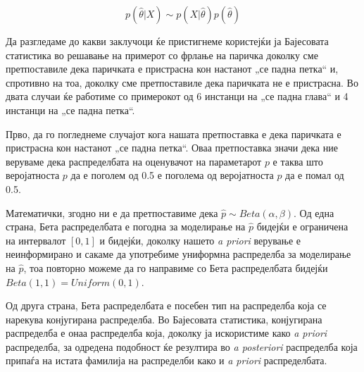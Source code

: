 \documentclass[12pt]{article}
\numberwithin{equation}{section}
\begin{document}
\begin{equation}\label{bayes_eq_sim}
p(\widehat{\theta}|X) \sim p(X|\widehat{\theta})p(\widehat{\theta})
\end{equation}

Да разгледаме до какви заклучоци ќе пристигнеме користејќи ја Бајесовата статистика во решавање на примерот со фрлање на паричка доколку сме претпоставиле дека паричката е пристрасна кон настанот „се падна петка“ и, спротивно на тоа, доколку сме претпоставиле дека паричката не е пристрасна. Во двата случаи ќе работиме со примерокот од 6 инстанци на „се падна глава“ и 4 инстанци на „се падна петка“.

Прво, да го погледнеме случајот кога нашата претпоставка е дека паричката е пристрасна кон настанот „се падна петка“. Оваа претпоставка значи дека ние веруваме дека распределбата на оценувачот на параметарот \(p\) е таква што веројатноста \(p\) да е поголем од 0.5 е поголема од веројатноста \(p\) да е помал од 0.5.

Математички, згодно ни е да претпоставиме дека \(\widehat{p} \sim Beta(\alpha, \beta)\). Од една страна, Бета распределбата е погодна за моделирање на \(\widehat{p}\) бидејќи е ограничена на интервалот \([0, 1]\) и бидејќи, доколку нашето \textit{a priori} верување е неинформирано и сакаме да употребиме униформна распределба за моделирање на \(\widehat{p}\), тоа повторно можеме да го направиме со Бета распределбата бидејќи \(Beta(1, 1) = Uniform(0, 1)\).

Од друга страна, Бета распределбата е посебен тип на распределба која се нарекува конјугирана распределба. Во Бајесовата статистика, конјугирана распределба е онаа распределба која, доколку ја искористиме како \textit{a priori} распределба, за одредена подобност ќе резултира во \textit{a posteriori} распределба која припаѓа на истата фамилија на распределби како и \textit{a priori} распределбата.
\end{document}
